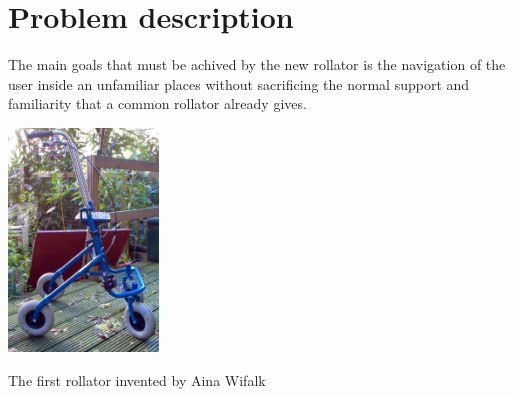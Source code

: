 \chapter{Problem description}

The main goals that must be achived by the new rollator is the navigation of the user inside an unfamiliar places without sacrificing the normal support and familiarity that a common rollator already gives.

\vspace{1cm}
\begin{center}
	\includegraphics[width=0.3\textwidth]{img/rollator-old.jpg}    
\end{center}
\begin{center}
	The first rollator invented by Aina Wifalk \cite{imgrollator}  
\end{center}
\vspace{1cm} 










  
